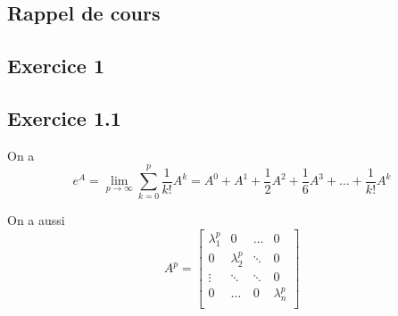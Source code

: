 \documentclass[]{book}
\theoremstyle{definition}
\begin{document}
\subsection*{Rappel de cours}

\newpage
\subsection*{Exercice 1}
\subsection*{Exercice 1.1}
On a 
$$e^A = \lim_{p \to \infty}\sum_{k= 0}^{p}{\frac{1}{k!}A^k} = A^0 + A^1 + \frac{1}{2}A^2 + \frac{1}{6}A^3 + \ldots + \frac{1}{k!}A^k$$

On a aussi
$$
A^p = 
\begin{bmatrix}
\lambda_1^p & 0 & \ldots & 0 \\    
0 & \lambda_2^p  & \ddots & 0 \\
\vdots & \ddots & \ddots & 0 \\    
0 & \ldots & 0 & \lambda_n^p\\
\end{bmatrix}
$$
\end{document}

